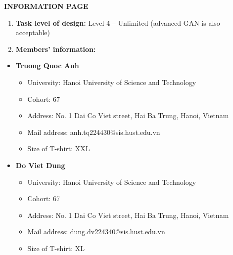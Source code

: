 \begin{center}
    \textbf{\LARGE INFORMATION PAGE}
\end{center}

\begin{enumerate}
    \item \textbf{Task level of design:} Level 4 -- Unlimited (advanced GAN is also acceptable)

    \item \textbf{Members' information:}
\end{enumerate}

\begin{itemize}
    \item \textbf{Truong Quoc Anh}
    \begin{itemize}
        \item University: Hanoi University of Science and Technology
        \item Cohort: 67
        \item Address: No. 1 Dai Co Viet street, Hai Ba Trung, Hanoi, Vietnam
        \item Mail address: anh.tq224430@sis.hust.edu.vn
        \item Size of T-shirt: XXL
    \end{itemize}

    \item \textbf{Do Viet Dung}
    \begin{itemize}
        \item University: Hanoi University of Science and Technology
        \item Cohort: 67
        \item Address: No. 1 Dai Co Viet street, Hai Ba Trung, Hanoi, Vietnam
        \item Mail address: dung.dv224340@sis.hust.edu.vn
        \item Size of T-shirt: XL
    \end{itemize}
\end{itemize}

\newpage